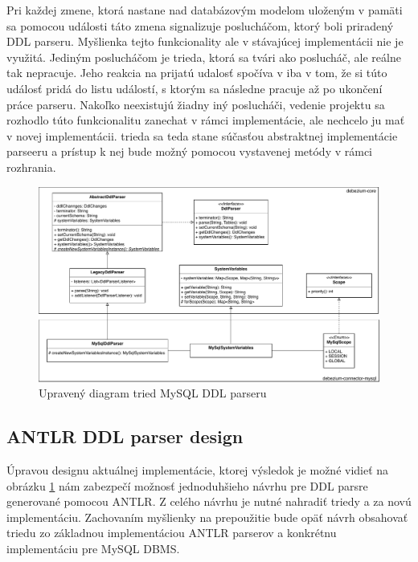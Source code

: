 Pri každej zmene, ktorá nastane nad databázovým modelom uloženým v pamäti sa pomocou události táto zmena signalizuje poslucháčom, ktorý boli priradený DDL parseru. Myšlienka tejto funkcionality ale v stávajúcej implementácii nie je využitá. Jediným poslucháčom je  trieda, ktorá sa tvári ako poslucháč, ale reálne tak nepracuje. Jeho reakcia na prijatú udalosť spočíva v iba v tom, že si túto událosť pridá do listu událostí, s ktorým sa následne pracuje až po ukončení práce parseru. Nakoľko neexistujú žiadny iný poslucháči, vedenie projektu sa rozhodlo túto funkcionalitu zanechat v rámci  implementácie, ale nechcelo ju mať v novej implementácii.  trieda sa teda stane súčasťou abstraktnej implementácie parseeru a prístup k nej bude možný pomocou vystavenej metódy v rámci  rozhrania.

\begin{figure}[H]
\begin{center}
\includegraphics[width=15cm]{figures/New_design.pdf}
\caption{Upravený diagram tried MySQL DDL parseru}
\label{fig:class_diagram_new}
\end{center}
\end{figure}

\subsection{ANTLR DDL parser design}
Úpravou designu aktuálnej implementácie, ktorej výsledok je možné vidieť na obrázku \ref{fig:class_diagram_new} nám zabezpečí možnosť jednoduhšieho návrhu pre DDL parsre generované pomocou \mbox{ANTLR}. Z celého návrhu je nutné nahradiť triedy  a  za novú implementáciu. Zachovaním myšlienky na prepoužitie bude opäť návrh obsahovať triedu zo základnou implementáciou ANTLR parserov a konkrétnu implementáciu pre MySQL DBMS.

